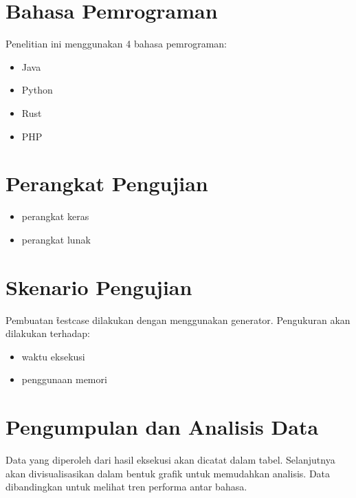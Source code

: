 \section{Bahasa Pemrograman}
Penelitian ini menggunakan 4 bahasa pemrograman:
\begin{itemize}
	\item Java
	\item Python
	\item Rust
	\item PHP
\end{itemize}

\section{Perangkat Pengujian}
\label{sec:perangkatPengujian}
\begin{itemize}
	\item perangkat keras
	\item perangkat lunak
\end{itemize}

\section{Skenario Pengujian}
\label{sec:skenarioPengujian}
Pembuatan \f{testcase} dilakukan dengan menggunakan  generator.
Pengukuran akan dilakukan terhadap:
\begin{itemize}
	\item waktu eksekusi
	\item penggunaan memori
\end{itemize}

\section{Pengumpulan dan Analisis Data}
\label{sec:pengumpulanAnalisisData}
Data yang diperoleh dari hasil eksekusi akan dicatat dalam tabel. Selanjutnya akan divisualisasikan dalam bentuk grafik untuk memudahkan analisis. Data dibandingkan untuk melihat tren performa antar bahasa.



